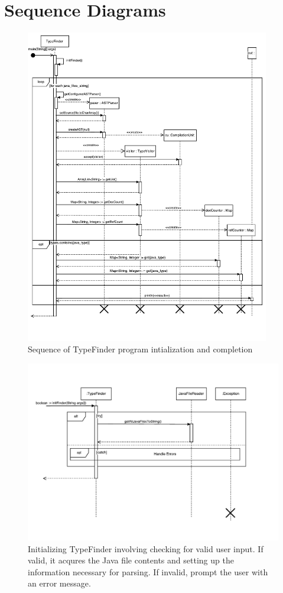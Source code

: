 \documentclass[12p]{article}
\begin{document}
\section{Sequence Diagrams}
\begin{figure}[H]
  \includegraphics[width=0.95\textwidth]{mainTypeFinder.pdf}
  \caption{Sequence of TypeFinder program intialization and completion} %
  \label{fig:sequence1}
\end{figure}

\begin{figure}
  \includegraphics[width=1.0\textwidth]{initFrinder.pdf}
  \caption{Initializing TypeFinder involving checking for valid user input. If valid, it acqures the Java file contents and setting up the information necessary for parsing. If invalid, prompt the user with an error message.} %
  \label{fig:sequence2}
\end{figure}
\end{document}
